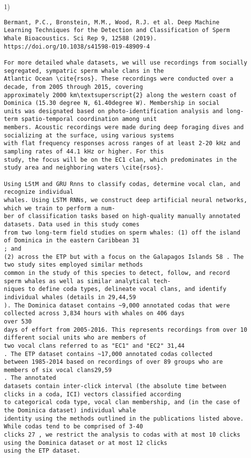 \documentclass{article}
\begin{document}
1) 
\begin{lstlisting}[breaklines=true, breakatwhitespace=true, columns=flexible, basicstyle=\ttfamily\small]
Bermant, P.C., Bronstein, M.M., Wood, R.J. et al. Deep Machine Learning Techniques for the Detection and Classification of Sperm Whale Bioacoustics. Sci Rep 9, 12588 (2019). https://doi.org/10.1038/s41598-019-48909-4

For more detailed whale datasets, we will use recordings from socially segregated, sympatric sperm whale clans in the 
Atlantic Ocean \cite{rsos}. These recordings were conducted over a decade, from 2005 through 2015, covering 
approximately 2000 km\textsuperscript{2} along the western coast of Dominica (15.30 degree N, 61.40degree W). Membership in social 
units was designated based on photo-identification analysis and long-term spatio-temporal coordination among unit 
members. Acoustic recordings were made during deep foraging dives and socializing at the surface, using various systems 
with flat frequency responses across ranges of at least 2-20 kHz and sampling rates of 44.1 kHz or higher. For this 
study, the focus will be on the EC1 clan, which predominates in the study area and neighboring waters \cite{rsos}.

Using LStM and GRU Rnns to classify codas, determine vocal clan, and recognize individual
whales. Using LSTM RNNs, we construct deep artificial neural networks, which we train to perform a num-
ber of classification tasks based on high-quality manually annotated datasets. Data used in this study comes
from two long-term field studies on sperm whales: (1) off the island of Dominica in the eastern Caribbean 31
; and
(2) across the ETP but with a focus on the Galapagos Islands 58 . The two study sites employed similar methods
common in the study of this species to detect, follow, and record sperm whales as well as similar analytical tech-
niques to define coda types, delineate vocal clans, and identify individual whales (details in 29,44,59
). The Dominica dataset contains ~9,000 annotated codas that were collected across 3,834 hours with whales on 406 days 
over 530
days of effort from 2005-2016. This represents recordings from over 10 different social units who are members of
two vocal clans referred to as "EC1" and "EC2" 31,44
. The ETP dataset contains ~17,000 annotated codas collected
between 1985-2014 based on recordings of over 89 groups who are members of six vocal clans29,59
. The annotated
datasets contain inter-click interval (the absolute time between clicks in a coda, ICI) vectors classified according
to categorical coda type, vocal clan membership, and (in the case of the Dominica dataset) individual whale
identity using the methods outlined in the publications listed above. While codas tend to be comprised of 3-40
clicks 27 , we restrict the analysis to codas with at most 10 clicks using the Dominica dataset or at most 12 clicks
using the ETP dataset.


\end{lstlisting}
\end{document}
